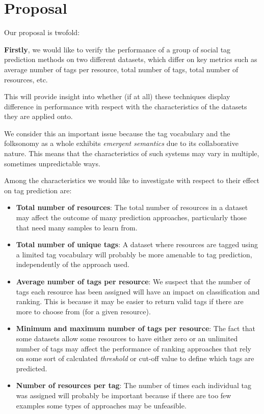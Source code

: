 \chapter{Proposal}\label{chap:proposal}

Our proposal is twofold:

\textbf{Firstly}, we would like to verify the performance of a group of social tag prediction methods on two different datasets, which differ on key metrics such as average number of tags per resource, total number of tags, total number of resources, etc.

This will provide insight into whether (if at all)  these techniques display difference in performance with respect with the characteristics of the datasets they are applied onto.

We consider this an important issue because the tag vocabulary and the folksonomy as a whole exhibits \textit{emergent semantics} \citep{cattuto_etal_2007,koerner_etal_2010} due to its collaborative nature. This means that the characteristics of such systems may vary in multiple, sometimes unpredictable ways.

Among the characteristics we would like to investigate with respect to their effect on tag prediction are:

\begin{itemize}
    \item \textbf{Total number of resources}: The total number of resources in a dataset may affect the outcome of many prediction approaches, particularly those that need many samples to learn from.
    
    \item \textbf{Total number of unique tags}: A dataset where resources are tagged using a limited tag vocabulary will probably be more amenable to tag prediction, independently of the approach used.
    
    \item \textbf{Average number of tags per resource}: We suspect that the number of tags each resource has been assigned will have an impact on classification and ranking. This is because it may be easier to return valid tags if there are more to choose from (for a given resource).
    
    \item \textbf{Minimum and maximum number of tags per resource}: The fact that some datasets allow some resources to have either zero or an unlimited number of tags may affect the performance of ranking approaches that rely on some sort of calculated \textit{threshold} or cut-off value to define which tags are predicted.
    
    \item \textbf{Number of resources per tag}: The number of times each individual tag was assigned will probably be important because if there are too few examples some types of approaches may be unfeasible.

\end{itemize}

